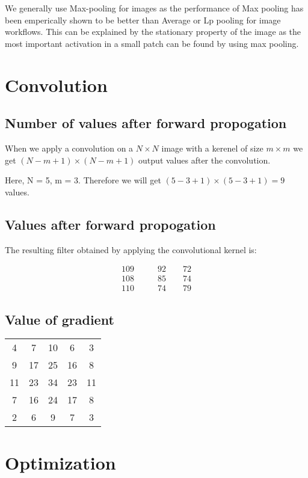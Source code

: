 \documentclass{article}
\begin{document}
We generally use Max-pooling for images as the performance of Max pooling has been emperically shown to be better than Average or Lp pooling for image workflows.  This can be explained by the stationary property of the image as the most important activation in a small patch can be found by using max pooling.

\section{Convolution}
\subsection{Number of values after forward propogation}
When we apply a convolution on a $N \times N$ image with a kerenel of size $ m \times m $ we get $(N-m+1) \times (N-m+1)$ output values after the convolution.

Here, N = 5, m = 3.
Therefore we will get $(5-3+1) \times (5-3+1) = 9$ values.
\subsection{Values after forward propogation}
The resulting filter obtained by applying the convolutional kernel is:
\begin{centering}
  \begin{align*}
  109 &\qquad 92 \qquad 72 \\
  108 &\qquad 85 \qquad 74 \\
  110 &\qquad 74 \qquad 79
  \end{align*}
\end{centering}

\subsection{Value of gradient}
\begin{center}
\begin{tabular}{c c c c c }
   4 &   7  &  10  &   6  &   3 \\
   9 &  17  &  25 &   16 &    8 \\
  11 & 23  &  34 &   23 &   11 \\
   7 & 16 &   24 &   17 &    8 \\
   2 &  6 &    9 &    7 &    3
\end{tabular}
\end{center}

\section{Optimization}
\end{document}
